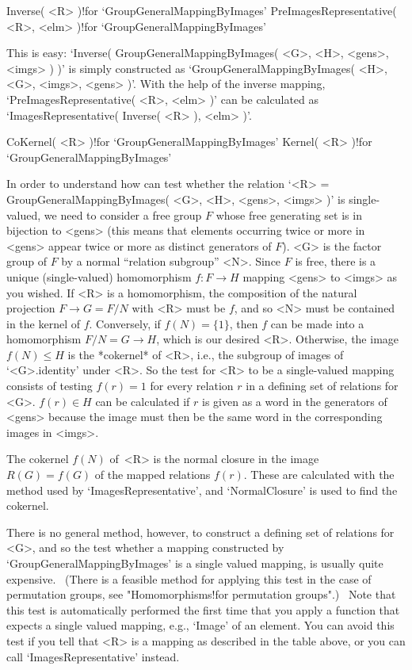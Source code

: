 \>Inverse( <R> )!{for `GroupGeneralMappingByImages'}
\>PreImagesRepresentative( <R>, <elm> )!{for %
                                         `GroupGeneralMappingByImages'}

This  is easy:  `Inverse( GroupGeneralMappingByImages( <G>,  <H>, <gens>,
<imgs> )  )' is simply  constructed as `GroupGeneralMappingByImages( <H>,
<G>,  <imgs>,  <gens> )'.   With   the help   of   the inverse   mapping,
`PreImagesRepresentative(   <R>,  <elm>     )' can    be    calculated as
`ImagesRepresentative( Inverse( <R> ), <elm> )'.

\>CoKernel( <R> )!{for `GroupGeneralMappingByImages'}
\>Kernel( <R> )!{for `GroupGeneralMappingByImages'}

\danger In  order to understand how {\GAP}  can test whether the relation
`<R>   =  GroupGeneralMappingByImages( <G>, <H>,   <gens>,  <imgs>  )' is
single-valued, we need to consider a free group $F$ whose free generating
set is in bijection  to <gens> (this means  that elements occurring twice
or more in <gens> appear  twice or more as  distinct generators of  $F$).
<G>  is the factor  group of $F$  by a  normal ``relation subgroup'' <N>.
Since $F$ is  free,    there is a unique  (single-valued)    homomorphism
$f\colon  F\to H$ mapping  <gens> to <imgs>  as you wished.  If  <R> is a
homomorphism, the composition of the natural projection $F\to G=F/N$ with
<R>   must be $f$,  and so  <N> must be  contained in  the kernel of $f$.
Conversely, if $f(N)=\{1\}$, then  $f$  can be  made into a  homomorphism
$F/N=G\to H$, which is our desired <R>.  Otherwise, the image $f(N)\le H$
is the *cokernel* of <R>, i.e., the subgroup  of images of `<G>.identity'
under <R>. So the test for <R> to  be a single-valued mapping consists of
testing $f(r)=1$ for  every relation $r$ in a  defining  set of relations
for <G>. $f(r)\in H$ can be calculated if  $r$ is given  as a word in the
generators of <gens> because the image must then  be the same word in the
corresponding images in <imgs>.

The cokernel $f(N)$  of~<R> is the  normal closure  in the  image $R(G) =
f(G)$  of  the mapped  relations  $f(r)$.  These are calculated  with the
method used by  `ImagesRepresentative', and  `NormalClosure' is used   to
find the cokernel.

There is  no general  method, however,  to  construct  a defining set  of
relations for <G>,  and so  the test  whether  a mapping  constructed  by
`GroupGeneralMappingByImages'  is  a  single  valued  mapping, is usually
quite expensive. \ (There is a feasible method for  applying this test in
the  case  of  permutation  groups,  see  "Homomorphisms!for  permutation
groups".) \ Note that this test is automatically performed the first time
that you apply a  function  that expects a  single valued  mapping, e.g.,
`Image'  of an element. You can  avoid this test  if you tell {\GAP} that
<R> is a   mapping as  described in the    table above, or you  can  call
`ImagesRepresentative' instead.


